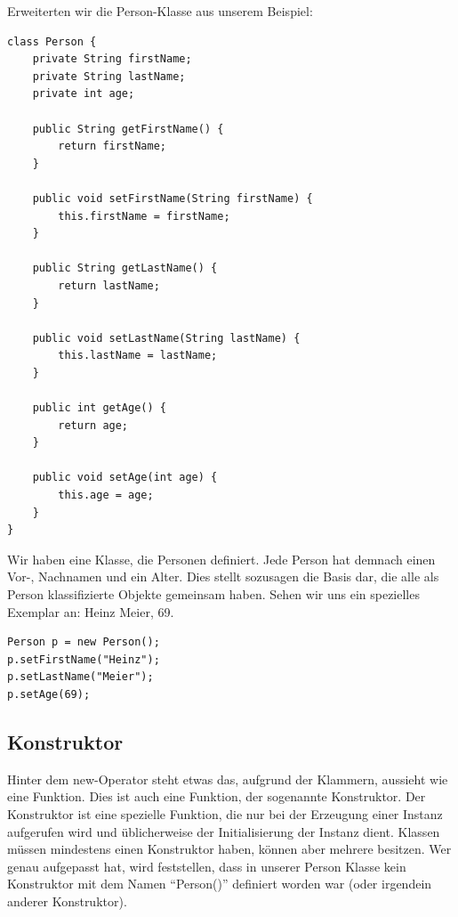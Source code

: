 \noindent Erweiterten wir die Person-Klasse aus unserem Beispiel:

\begin{lstlisting}
class Person {
    private String firstName;
    private String lastName;
    private int age;

    public String getFirstName() {
        return firstName;
    }

    public void setFirstName(String firstName) {
        this.firstName = firstName;
    }

    public String getLastName() {
        return lastName;
    }

    public void setLastName(String lastName) {
        this.lastName = lastName;
    }

    public int getAge() {
        return age;
    }

    public void setAge(int age) {
        this.age = age;
    }
}
\end{lstlisting}



Wir haben eine Klasse, die Personen definiert. Jede Person hat demnach einen Vor-, Nachnamen und ein Alter. Dies stellt sozusagen die Basis dar, die alle als Person klassifizierte Objekte gemeinsam haben. Sehen wir uns ein spezielles Exemplar an: Heinz Meier, 69.

\begin{lstlisting}
Person p = new Person();
p.setFirstName("Heinz");
p.setLastName("Meier");
p.setAge(69);
\end{lstlisting}

\subsection{Konstruktor}

Hinter dem new-Operator steht etwas das, aufgrund der Klammern, aussieht wie eine Funktion. Dies ist auch eine Funktion, der sogenannte Konstruktor. Der Konstruktor ist eine spezielle Funktion, die nur bei der Erzeugung einer Instanz aufgerufen wird und üblicherweise der Initialisierung der Instanz dient. Klassen müssen mindestens einen Konstruktor haben, können aber mehrere besitzen. Wer genau aufgepasst hat, wird feststellen, dass in unserer Person Klasse kein Konstruktor mit dem Namen "`Person()"' definiert worden war (oder irgendein anderer Konstruktor).

